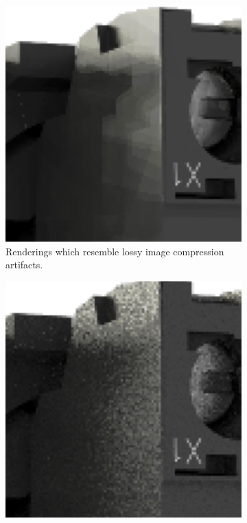 \begin{figure}[H]
    \centering
    \hspace*{2cm}
    \begin{subfigure}[t]{0.3\textwidth}
        \includegraphics[width=\textwidth]{resources/bad-seed-noisy.png}
        \caption{Renderings which resemble lossy image compression artifacts.}
        \label{fig:rngNoiseArtifactsHighlightsBadNoisy}
    \end{subfigure}
    \hfill
    \begin{subfigure}[t]{0.3\textwidth}
        \includegraphics[width=\textwidth]{resources/good-seed-noisy.png}

\end{subfigure}
\end{figure}
